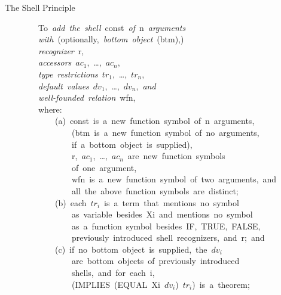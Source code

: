 \documentclass[10pt]{book}
\newenvironment{pubasis}{\begin{flushleft}}{\end{flushleft}}
\begin{document}
\hrulefill 

\begin{center}
The Shell Principle
\end{center}

\begin{pubasis}
~~~~~~~~To~\emph{add~the~shell}~const~\emph{of}~n~\emph{arguments}\\
~~~~~~~~\emph{with}~(optionally,~\emph{bottom~object}~(btm),)\\
~~~~~~~~\emph{recognizer}~r,\\
~~~~~~~~\emph{accessors}~$ac_{1}$,~\ldots{},~$ac_{n}$,\\
~~~~~~~~\emph{type~restrictions}~$tr_{1}$,~\ldots{},~$tr_{n}$,\\
~~~~~~~~\emph{default~values}~$dv_{1}$,~\ldots{},~$dv_{n}$,~\emph{and}\\
~~~~~~~~\emph{well-founded~relation}~wfn,\\
~~~~~~~~where:\\

~~~~~~~~~~~~(a)~const~is~a~new~function~symbol~of~n~arguments,\\
~~~~~~~~~~~~~~~~(btm~is~a~new~function~symbol~of~no~arguments,\\
~~~~~~~~~~~~~~~~if~a~bottom~object~is~supplied),\\
~~~~~~~~~~~~~~~~r,~$ac_{1}$,~\ldots{},~$ac_{n}$~are~new~function~symbols\\
~~~~~~~~~~~~~~~~of~one~argument,\\
~~~~~~~~~~~~~~~~wfn~is~a~new~function~symbol~of~two~arguments,~and\\
~~~~~~~~~~~~~~~~all~the~above~function~symbols~are~distinct;\\

~~~~~~~~~~~~(b)~each~$tr_{i}$~is~a~term~that~mentions~no~symbol\\
~~~~~~~~~~~~~~~~as~variable~besides~Xi~and~mentions~no~symbol\\
~~~~~~~~~~~~~~~~as~a~function~symbol~besides~IF,~TRUE,~FALSE,~\\
~~~~~~~~~~~~~~~~previously~introduced~shell~recognizers,~and~r;~and\\

~~~~~~~~~~~~(c)~if~no~bottom~object~is~supplied,~the~$dv_{i}$\\
~~~~~~~~~~~~~~~~are~bottom~objects~of~previously~introduced\\
~~~~~~~~~~~~~~~~shells,~and~for~each~i,\\

~~~~~~~~~~~~~~~~(IMPLIES~(EQUAL~Xi~$dv_{i}$)~$tr_{i}$)~is~a~theorem;\\


\end{pubasis}
\end{document}
